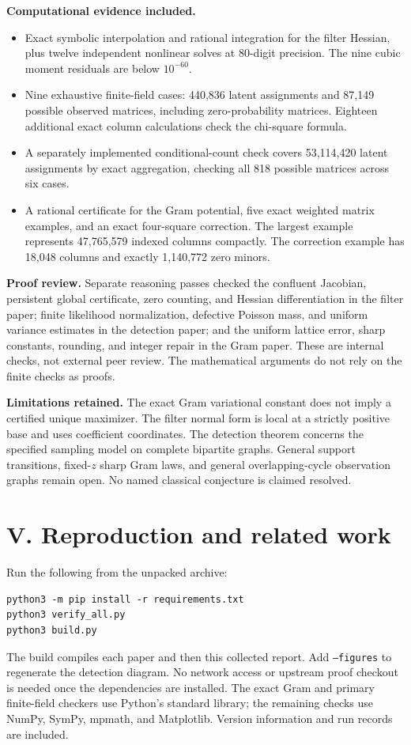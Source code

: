 \documentclass[11pt]{article}
\newcommand{\guideheading}[1]{\section*{\color{ink}#1}\addcontentsline{toc}{section}{#1}}
\begin{document}
\textbf{Computational evidence included.}
\begin{itemize}
\item Exact symbolic interpolation and rational integration for the filter
Hessian, plus twelve independent nonlinear solves at 80-digit precision.
The nine cubic moment residuals are below $10^{-60}$.
\item Nine exhaustive finite-field cases: 440,836 latent assignments and
87,149 possible observed matrices, including zero-probability matrices.
Eighteen additional exact column calculations check the chi-square formula.
\item A separately implemented conditional-count check covers 53,114,420
latent assignments by exact aggregation, checking all 818 possible matrices
across six cases.
\item A rational certificate for the Gram potential, five exact weighted
matrix examples, and an exact four-square correction. The largest example
represents 47,765,579 indexed columns compactly. The correction example has
18,048 columns and exactly 1,140,772 zero minors.
\end{itemize}

\textbf{Proof review.}
Separate reasoning passes checked the confluent Jacobian, persistent global
certificate, zero counting, and Hessian differentiation in the filter
paper; finite likelihood normalization, defective Poisson mass, and
uniform variance estimates in the detection paper; and the uniform
lattice error, sharp constants, rounding, and integer repair in the Gram
paper. These are internal checks, not external peer review. The
mathematical arguments do not rely on the finite checks as proofs.

\textbf{Limitations retained.}
The exact Gram variational constant does not imply a certified unique
maximizer. The filter normal form is local at a strictly positive base and
uses coefficient coordinates. The detection theorem concerns the specified
sampling model on complete bipartite graphs. General support transitions,
fixed-$z$ sharp Gram laws, and general overlapping-cycle observation graphs
remain open. No named classical conjecture is claimed resolved.

\newpage
\guideheading{V. Reproduction and related work}
Run the following from the unpacked archive:
\begin{verbatim}
python3 -m pip install -r requirements.txt
python3 verify_all.py
python3 build.py
\end{verbatim}
The build compiles each paper and then this collected report. Add
\texttt{--figures} to regenerate the detection diagram. No network access
or upstream proof checkout is needed once the dependencies are installed.
The exact Gram and primary finite-field checkers use Python's standard
library; the remaining checks use NumPy, SymPy, mpmath, and Matplotlib.
Version information and run records are included.
\end{document}
